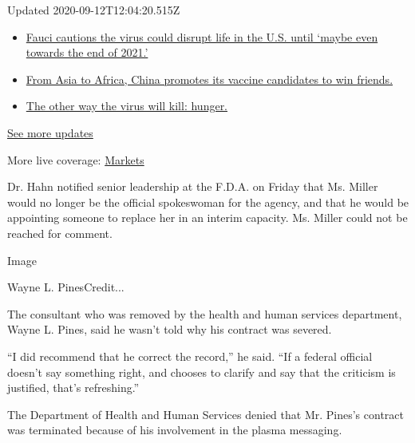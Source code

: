 Updated 2020-09-12T12:04:20.515Z

\begin{itemize}
\tightlist
\item
  \href{https://www.nytimes3xbfgragh.onion/2020/09/11/world/covid-19-coronavirus.html?action=click\&pgtype=Article\&state=default\&region=MAIN_CONTENT_1\&context=storylines_live_updates\#link-dfb8a16}{Fauci
  cautions the virus could disrupt life in the U.S. until `maybe even
  towards the end of 2021.'}
\item
  \href{https://www.nytimes3xbfgragh.onion/2020/09/11/world/covid-19-coronavirus.html?action=click\&pgtype=Article\&state=default\&region=MAIN_CONTENT_1\&context=storylines_live_updates\#link-7104d154}{From
  Asia to Africa, China promotes its vaccine candidates to win friends.}
\item
  \href{https://www.nytimes3xbfgragh.onion/2020/09/11/world/covid-19-coronavirus.html?action=click\&pgtype=Article\&state=default\&region=MAIN_CONTENT_1\&context=storylines_live_updates\#link-393ad215}{The
  other way the virus will kill: hunger.}
\end{itemize}

\href{https://www.nytimes3xbfgragh.onion/2020/09/11/world/covid-19-coronavirus.html?action=click\&pgtype=Article\&state=default\&region=MAIN_CONTENT_1\&context=storylines_live_updates}{See
more updates}

More live coverage:
\href{https://www.nytimes3xbfgragh.onion/live/2020/09/11/business/stock-market-today-coronavirus?action=click\&pgtype=Article\&state=default\&region=MAIN_CONTENT_1\&context=storylines_live_updates}{Markets}

Dr. Hahn notified senior leadership at the F.D.A. on Friday that Ms.
Miller would no longer be the official spokeswoman for the agency, and
that he would be appointing someone to replace her in an interim
capacity. Ms. Miller could not be reached for comment.

Image

Wayne L. PinesCredit...

The consultant who was removed by the health and human services
department, Wayne L. Pines, said he wasn't told why his contract was
severed.

``I did recommend that he correct the record,'' he said. ``If a federal
official doesn't say something right, and chooses to clarify and say
that the criticism is justified, that's refreshing.''

The Department of Health and Human Services denied that Mr. Pines's
contract was terminated because of his involvement in the plasma
messaging.


